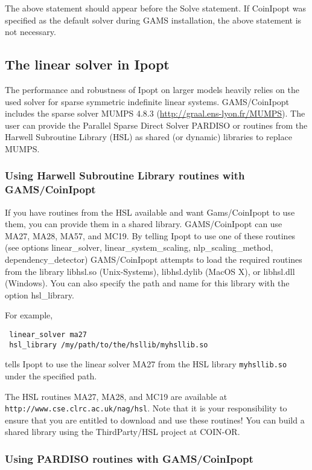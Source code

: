 The above statement should appear before the Solve statement.
If CoinIpopt was specified as the default solver during GAMS installation, the above statement is not necessary.

\subsection{The linear solver in Ipopt}
\label{ipoptlinearsolver}
\hypertarget{ipoptlinearsolver}{}

The performance and robustness of Ipopt on larger models heavily relies on the used solver for sparse symmetric indefinite linear systems.
GAMS/CoinIpopt includes the sparse solver MUMPS 4.8.3 (\url{http://graal.ens-lyon.fr/MUMPS}).
The user can provide the Parallel Sparse Direct Solver PARDISO or routines from the Harwell Subroutine Library (HSL) as shared (or dynamic) libraries to replace MUMPS.

\subsubsection{Using Harwell Subroutine Library routines with GAMS/CoinIpopt}

If you have routines from the HSL available and want Gams/CoinIpopt to use them, you can provide them in a shared library.
GAMS/CoinIpopt can use MA27, MA28, MA57, and MC19.
By telling Ipopt to use one of these routines (see options linear\_solver, linear\_system\_scaling, nlp\_scaling\_method, dependency\_detector) GAMS/CoinIpopt attempts to load the required routines from the library libhsl.so (Unix-Systems), libhsl.dylib (MacOS X), or libhsl.dll (Windows).
You can also specify the path and name for this library with the option hsl\_library.

For example,
\begin{verbatim}
 linear_solver ma27
 hsl_library /my/path/to/the/hsllib/myhsllib.so
\end{verbatim}
tells Ipopt to use the linear solver MA27 from the HSL library \verb=myhsllib.so= under the specified path.

The HSL routines MA27, MA28, and MC19 are available at \texttt{http://www.cse.clrc.ac.uk/nag/hsl}.
Note that it is your responsibility to ensure that you are entitled to download and use these routines!
You can build a shared library using the ThirdParty/HSL project at COIN-OR.

\subsubsection{Using PARDISO routines with GAMS/CoinIpopt}

